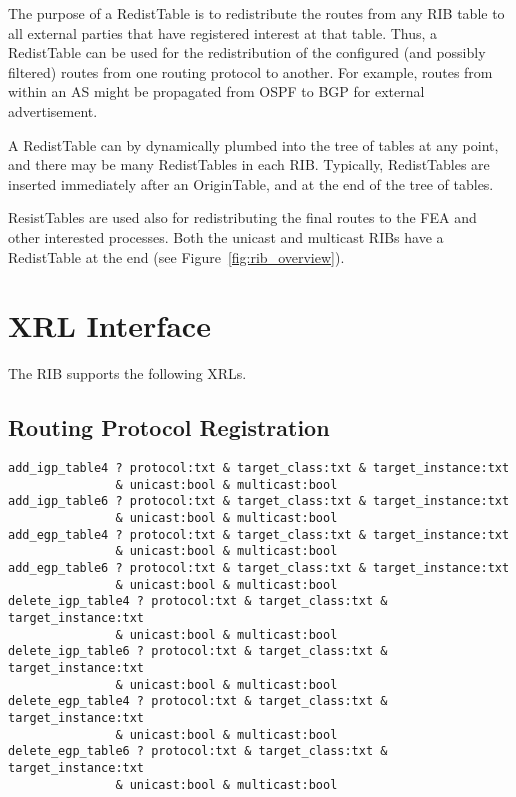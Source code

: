 \documentclass[11pt]{article}
\begin{document}
The purpose of a RedistTable is to redistribute the routes from any RIB
table to all external parties that have registered interest at that
table. Thus, a RedistTable can be used for the redistribution of the
configured (and possibly filtered) routes from one routing protocol to
another.  For example, routes from within an AS might be propagated from
OSPF to BGP for external advertisement.

A RedistTable can by dynamically plumbed into the tree of tables at any
point, and there may be many RedistTables in each RIB. Typically,
RedistTables are inserted immediately after an OriginTable, and at the
end of the tree of tables.

ResistTables are used also for redistributing the final routes to the
FEA and other interested processes. Both the unicast and multicast RIBs
have a RedistTable at the end (see Figure~\ref{fig:rib_overview}).

\section{XRL Interface}

The RIB supports the following XRLs.

\subsection{Routing Protocol Registration}

\begin{verbatim}
add_igp_table4 ? protocol:txt & target_class:txt & target_instance:txt
               & unicast:bool & multicast:bool
add_igp_table6 ? protocol:txt & target_class:txt & target_instance:txt
               & unicast:bool & multicast:bool
add_egp_table4 ? protocol:txt & target_class:txt & target_instance:txt
               & unicast:bool & multicast:bool
add_egp_table6 ? protocol:txt & target_class:txt & target_instance:txt
               & unicast:bool & multicast:bool
delete_igp_table4 ? protocol:txt & target_class:txt & target_instance:txt
               & unicast:bool & multicast:bool
delete_igp_table6 ? protocol:txt & target_class:txt & target_instance:txt
               & unicast:bool & multicast:bool
delete_egp_table4 ? protocol:txt & target_class:txt & target_instance:txt
               & unicast:bool & multicast:bool
delete_egp_table6 ? protocol:txt & target_class:txt & target_instance:txt
               & unicast:bool & multicast:bool
\end{verbatim}
\end{document}
